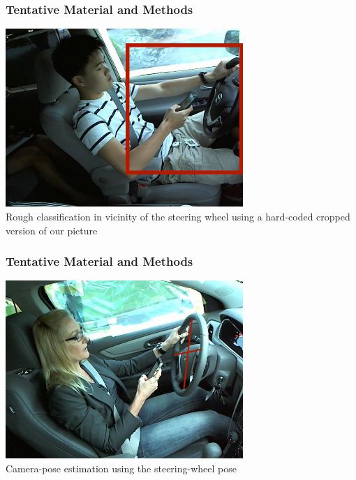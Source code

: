 \documentclass{beamer}
\begin{document}
    \begin{frame}
		\frametitle{Tentative Material and Methods}
        \begin{center}
        \includegraphics[width=9cm]{images/HandLocalisation.jpg}\\
        Rough classification in vicinity of the steering wheel using a hard-coded cropped version of our picture\end{center}
    \end{frame}


    \begin{frame}
		\frametitle{Tentative Material and Methods}
        \begin{center}
        \includegraphics[width=9cm]{images/CameraPose.jpg}\\
        Camera-pose estimation using the steering-wheel pose\end{center}
    \end{frame}
\end{document}

